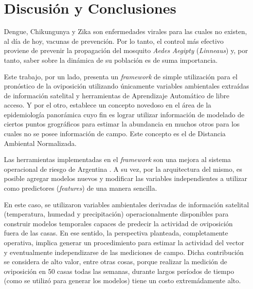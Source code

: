 



\justifying

\chapter{Discusión y Conclusiones}

  \par Dengue, Chikungunya y Zika son enfermedades virales para las cuales no
    existen, al día de hoy, vacunas de prevención. Por lo tanto, el control
    más efectivo proviene de prevenir la propagación del mosquito
    \textit{Aedes Aegipty} (\textit{Linneaus}) y, por tanto, saber sobre la
    dinámica de su población es de suma importancia.

  \par Este trabajo, por un lado, presenta un \textit{framework} de simple
    utilización para el
    pronóstico de la oviposición utilizando
    únicamente variables ambientales extraídas de información satelital y
    herramientas de Aprendizaje Automático de libre acceso. Y por el otro,
    establece un concepto novedoso en el área de la epidemiología panorámica
    cuyo fin es lograr utilizar información de modelado de ciertos puntos grográficos
    para estimar la abundancia en muchos otros para los cuales no se posee
    información de campo. Este concepto es el de Distancia Ambiental Normalizada.

  \par Las herramientas implementadas en el \textit{framework}
    son una mejora al sistema operacional de riesgo de
    Argentina \cite{porcasi_operative}. A su vez, por la arquitectura del mismo,
    es posible agregar modelos nuevos y modificar las variables independientes a utilizar como
    predictores (\textit{features}) de una manera sencilla.

  \par En este caso, se utilizaron variables ambientales derivadas de información satelital
    (temperatura, humedad y precipitación) operacionalmente disponibles para
    construir modelos temporales capaces de predecir la actividad de oviposición
    fuera de las casas. En ese sentido, la perspectiva planteada, completamente operativa,
    implica generar un procedimiento para estimar la actividad del vector
    y eventualmente independizarse de las mediciones de campo. Dicha contribución
    se considera de alto valor, entre otras cosas, porque realizar la medición
    de oviposición en 50 casas todas las semanas, durante
    largos períodos de tiempo (como se utilizó para generar los modelos) tiene
    un costo extremádamente alto.


